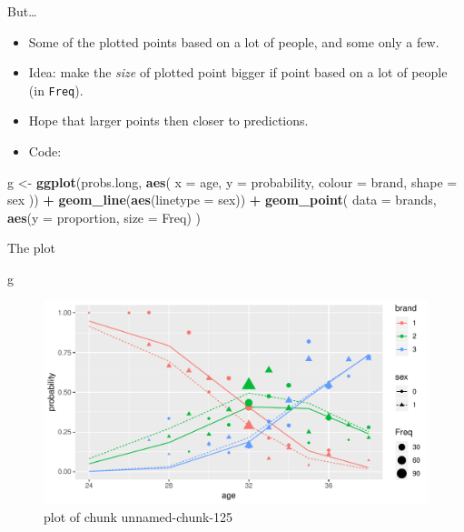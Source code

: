 \documentclass[ignorenonframetext,]{beamer}
\newenvironment{Shaded}{\begin{snugshade}}{\end{snugshade}}
\newcommand{\DataTypeTok}[1]{\textcolor[rgb]{0.13,0.29,0.53}{#1}}
\newcommand{\KeywordTok}[1]{\textcolor[rgb]{0.13,0.29,0.53}{\textbf{#1}}}
\newcommand{\NormalTok}[1]{#1}
\newcommand{\OperatorTok}[1]{\textcolor[rgb]{0.81,0.36,0.00}{\textbf{#1}}}
\newcommand{\StringTok}[1]{\textcolor[rgb]{0.31,0.60,0.02}{#1}}
\begin{document}
\begin{frame}[fragile]{But\ldots}
\protect\hypertarget{but-1}{}

\begin{itemize}
\item
  Some of the plotted points based on a lot of people, and some only a
  few.
\item
  Idea: make the \emph{size} of plotted point bigger if point based on a
  lot of people (in \texttt{Freq}).
\item
  Hope that larger points then closer to predictions.
\item
  Code:
\end{itemize}

\footnotesize

\begin{Shaded}
\begin{Highlighting}[]
\NormalTok{g <-}\StringTok{ }\KeywordTok{ggplot}\NormalTok{(probs.long, }\KeywordTok{aes}\NormalTok{(}
  \DataTypeTok{x =}\NormalTok{ age, }\DataTypeTok{y =}\NormalTok{ probability,}
  \DataTypeTok{colour =}\NormalTok{ brand, }\DataTypeTok{shape =}\NormalTok{ sex}
\NormalTok{)) }\OperatorTok{+}
\StringTok{  }\KeywordTok{geom_line}\NormalTok{(}\KeywordTok{aes}\NormalTok{(}\DataTypeTok{linetype =}\NormalTok{ sex)) }\OperatorTok{+}
\StringTok{  }\KeywordTok{geom_point}\NormalTok{(}
    \DataTypeTok{data =}\NormalTok{ brands,}
    \KeywordTok{aes}\NormalTok{(}\DataTypeTok{y =}\NormalTok{ proportion, }\DataTypeTok{size =}\NormalTok{ Freq)}
\NormalTok{  )}
\end{Highlighting}
\end{Shaded}

\normalsize

\end{frame}

\begin{frame}[fragile]{The plot}
\protect\hypertarget{the-plot-3}{}

\begin{Shaded}
\begin{Highlighting}[]
\NormalTok{g}
\end{Highlighting}
\end{Shaded}

\begin{figure}
\centering
\includegraphics{figure/unnamed-chunk-125-1.pdf}
\caption{plot of chunk unnamed-chunk-125}
\end{figure}

\end{frame}
\end{document}
